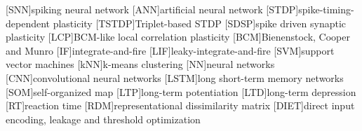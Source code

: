\begin{acronym}[XXXX]
    [SNN]{spiking neural network}
    [ANN]{artificial neural network}
    [STDP]{spike-timing-dependent plasticity}
    [TSTDP]{Triplet-based STDP}
    [SDSP]{spike driven synaptic plasticity}
    [LCP]{BCM-like local correlation plasticity}
    [BCM]{Bienenstock, Cooper and Munro}
    [IF]{integrate-and-fire}
    [LIF]{leaky-integrate-and-fire}
    [SVM]{support vector machines}
    [kNN]{k-means clustering}
    [NN]{neural networks}
    [CNN]{convolutional neural networks}
    [LSTM]{long short-term memory networks}
    [SOM]{self-organized map}
    [LTP]{long-term potentiation}
    [LTD]{long-term depression}
    [RT]{reaction time}
    [RDM]{representational dissimilarity matrix}
    [DIET]{direct input encoding, leakage and threshold optimization}
\end{acronym}